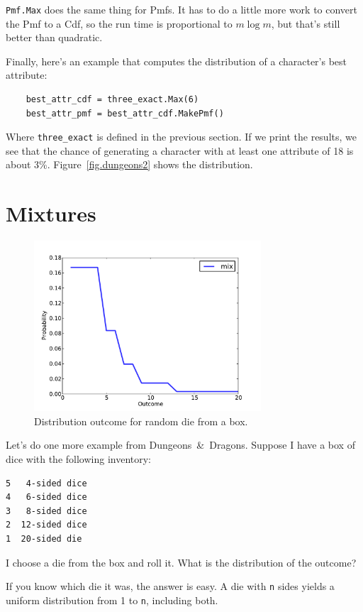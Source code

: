 \documentclass[12pt]{book}
\begin{document}
\verb"Pmf.Max" does the same thing for Pmfs.  It has to do a little
more work to convert the Pmf to a Cdf, so the run time is proportional
to $m \log m$, but that's still better than quadratic.

Finally, here's an example that computes the distribution of
a character's best attribute:

\begin{verbatim}
    best_attr_cdf = three_exact.Max(6)
    best_attr_pmf = best_attr_cdf.MakePmf()
\end{verbatim}

Where \verb"three_exact" is defined in the previous section.
If we print the results, we see that the chance of generating
a character with at least one attribute of 18 is about 3\%.
Figure~\ref{fig.dungeons2} shows the distribution.


\section{Mixtures}

\begin{figure}
\centerline{\includegraphics[height=2.5in]{figs/dungeons3.pdf}}
\caption{Distribution outcome for random die from a box.}
\label{fig.dungeons3}
\end{figure}

Let's do one more example from Dungeons~\&~Dragons.  Suppose
I have a box of dice with the following inventory:

\begin{verbatim}
5   4-sided dice
4   6-sided dice
3   8-sided dice
2  12-sided dice
1  20-sided die
\end{verbatim}

I choose a die from the box and roll it.  What is the distribution
of the outcome?

If you know which die it was, the answer is easy.  A die with {\tt n}
sides yields a uniform distribution from 1 to {\tt n}, including both.
\end{document}
